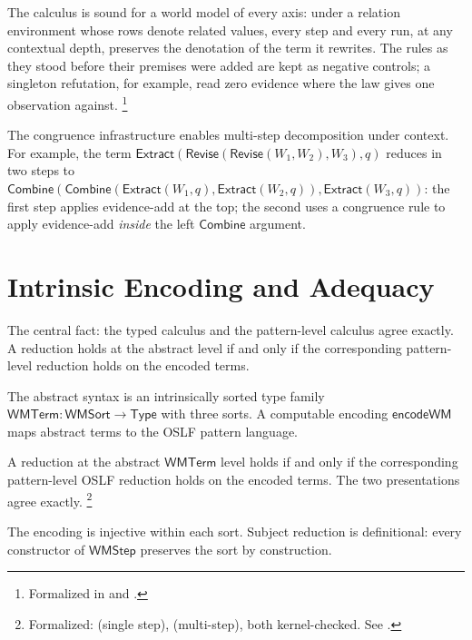 \documentclass[11pt,openany]{report}
\begin{document}
The calculus is sound for a world model of every axis: under a relation
environment whose rows denote related values, every step and every run, at
any contextual depth, preserves the denotation of the term it rewrites.  The
rules as they stood before their premises were added are kept as negative
controls; a singleton refutation, for example, read zero evidence where the
law gives one observation against.%
\footnote{Formalized in
and .}

The congruence infrastructure enables multi-step decomposition under
context.  For example, the term
$\mathsf{Extract}(\mathsf{Revise}(\mathsf{Revise}(W_1, W_2), W_3), q)$
reduces in two steps to
$\mathsf{Combine}(\mathsf{Combine}(\mathsf{Extract}(W_1, q),
\mathsf{Extract}(W_2, q)), \mathsf{Extract}(W_3, q))$:
the first step applies evidence-add at the top; the second uses a
congruence rule to apply evidence-add \emph{inside} the left
$\mathsf{Combine}$ argument.


\section{Intrinsic Encoding and Adequacy}

The central fact: the typed calculus and the pattern-level calculus
agree exactly.  A reduction holds at the abstract level if and only
if the corresponding pattern-level reduction holds on the encoded
terms.

The abstract syntax is an intrinsically sorted type family
$\mathsf{WMTerm} : \mathsf{WMSort} \to \mathsf{Type}$ with three
sorts.  A computable encoding $\mathsf{encodeWM}$ maps abstract
terms to the OSLF pattern language.

\begin{theorem}
A reduction at the abstract $\mathsf{WMTerm}$ level holds if and only
if the corresponding pattern-level OSLF reduction holds on the encoded
terms.  The two presentations agree exactly.%
\footnote{Formalized:  (single step),
 (multi-step), both kernel-checked.
See .}
\end{theorem}

\noindent
The encoding is injective within each sort.  Subject reduction is
definitional: every constructor of $\mathsf{WMStep}$ preserves the
sort by construction.
\end{document}
